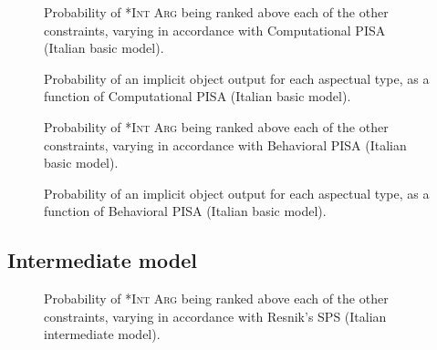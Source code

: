 \begin{figure}[!htb]
\caption{Probability of \textsc{*Int Arg} being ranked above each of the other constraints, varying in accordance with Computational PISA (Italian basic model).}
    
\end{figure}

\begin{figure}[!htb]
\caption{Probability of an implicit object output for each aspectual type, as a function of Computational PISA (Italian basic model).}
    
\end{figure}



\begin{figure}[!htb]
\caption{Probability of \textsc{*Int Arg} being ranked above each of the other constraints, varying in accordance with Behavioral PISA (Italian basic model).}
    
\end{figure}

\begin{figure}[!htb]
\caption{Probability of an implicit object output for each aspectual type, as a function of Behavioral PISA (Italian basic model).}
    
\end{figure}



\clearpage %

\subsection{Intermediate model} 


\begin{figure}[!htb]
\caption{Probability of \textsc{*Int Arg} being ranked above each of the other constraints, varying in accordance with Resnik's SPS (Italian intermediate model).}
    
\end{figure}

